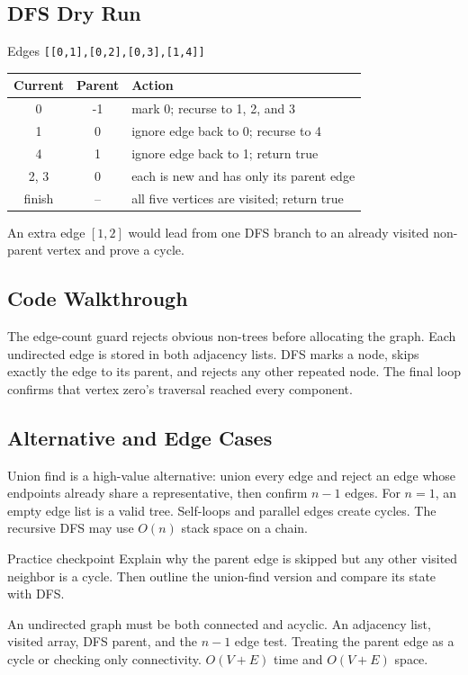 \subsection{DFS Dry Run}
\begin{dryrunbox}{Edges \texttt{[[0,1],[0,2],[0,3],[1,4]]}}
\begin{center}
\begin{tabularx}{\linewidth}{@{}c c X@{}}
\toprule
Current & Parent & Action \\
\midrule
0 & -1 & mark 0; recurse to 1, 2, and 3 \\
1 & 0 & ignore edge back to 0; recurse to 4 \\
4 & 1 & ignore edge back to 1; return true \\
2, 3 & 0 & each is new and has only its parent edge \\
finish & -- & all five vertices are visited; return true \\
\bottomrule
\end{tabularx}
\end{center}
An extra edge \([1,2]\) would lead from one DFS branch to an already visited
non-parent vertex and prove a cycle.
\end{dryrunbox}

\subsection{Code Walkthrough}
The edge-count guard rejects obvious non-trees before allocating the graph.
Each undirected edge is stored in both adjacency lists. DFS marks a node,
skips exactly the edge to its parent, and rejects any other repeated node. The
final loop confirms that vertex zero's traversal reached every component.

\subsection{Alternative and Edge Cases}
Union find is a high-value alternative: union every edge and reject an edge
whose endpoints already share a representative, then confirm \(n-1\) edges.
For \(n=1\), an empty edge list is a valid tree. Self-loops and parallel edges
create cycles. The recursive DFS may use \(O(n)\) stack space on a chain.

\begin{revisionbox}{Practice checkpoint}
Explain why the parent edge is skipped but any other visited neighbor is a
cycle. Then outline the union-find version and compare its state with DFS.
\end{revisionbox}
\chaptercheckpoint
  {An undirected graph must be both connected and acyclic.}
  {An adjacency list, visited array, DFS parent, and the \(n-1\) edge test.}
  {Treating the parent edge as a cycle or checking only connectivity.}
  {$O(V+E)$ time and $O(V+E)$ space.}
\judgeclassnote


